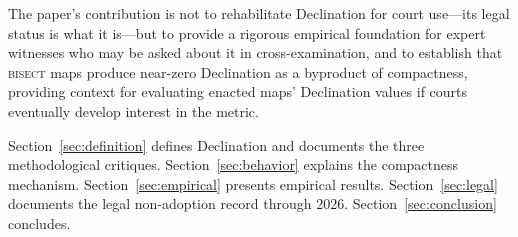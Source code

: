 The paper's contribution is not to rehabilitate Declination for court use---its legal
status is what it is---but to provide a rigorous empirical foundation for expert witnesses
who may be asked about it in cross-examination, and to establish that \textsc{bisect}
maps produce near-zero Declination as a byproduct of compactness, providing context for
evaluating enacted maps' Declination values if courts eventually develop interest in the metric.

Section~\ref{sec:definition} defines Declination and documents the three methodological
critiques. Section~\ref{sec:behavior} explains the compactness mechanism. Section~\ref{sec:empirical}
presents empirical results. Section~\ref{sec:legal} documents the legal non-adoption record
through 2026. Section~\ref{sec:conclusion} concludes.
